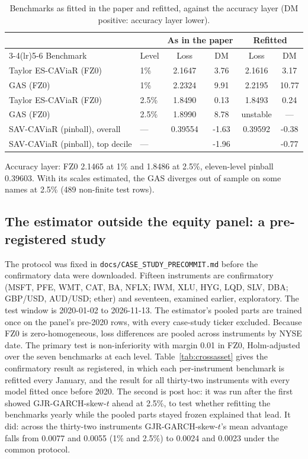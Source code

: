 \documentclass[11pt]{article}
\begin{document}
\begin{table}[htbp]\centering\begin{threeparttable}
\caption{Benchmarks as fitted in the paper and refitted, against the accuracy layer (DM positive: accuracy layer lower).}\label{tab:refit}\footnotesize
\begin{tabular}{llcccc}\toprule
 & & \multicolumn{2}{c}{As in the paper} & \multicolumn{2}{c}{Refitted} \\ \cmidrule(lr){3-4}\cmidrule(lr){5-6}
Benchmark & Level & Loss & DM & Loss & DM \\ \midrule
Taylor ES-CAViaR (FZ0) & 1\% & 2.1647 & 3.76 & 2.1616 & 3.17 \\
GAS (FZ0) & 1\% & 2.2324 & 9.91 & 2.2195 & 10.77 \\
Taylor ES-CAViaR (FZ0) & 2.5\% & 1.8490 & 0.13 & 1.8493 & 0.24 \\
GAS (FZ0) & 2.5\% & 1.8990 & 8.78 & unstable & --- \\
SAV-CAViaR (pinball), overall & --- & 0.39554 & -1.63 & 0.39592 & -0.38 \\
SAV-CAViaR (pinball), top decile & --- &  & -1.96 &  & -0.77 \\
\bottomrule\end{tabular}
\begin{tablenotes}\footnotesize\item Accuracy layer: FZ0 2.1465 at 1\% and 1.8486 at 2.5\%, eleven-level pinball 0.39603. With its scales estimated, the GAS diverges out of sample on some names at 2.5\% (489 non-finite test rows).\end{tablenotes}
\end{threeparttable}\end{table}

\subsection*{The estimator outside the equity panel: a pre-registered study}
The protocol was fixed in \texttt{docs/CASE\_STUDY\_PRECOMMIT.md} before the confirmatory data were downloaded. Fifteen instruments are confirmatory (MSFT, PFE, WMT, CAT, BA, NFLX; IWM, XLU, HYG, LQD, SLV, DBA; GBP/USD, AUD/USD; ether) and seventeen, examined earlier, exploratory. The test window is 2020-01-02 to 2026-11-13. The estimator's pooled parts are trained once on the panel's pre-2020 rows, with every case-study ticker excluded. Because FZ0 is zero-homogeneous, loss differences are pooled across instruments by NYSE date. The primary test is non-inferiority with margin 0.01 in FZ0, Holm-adjusted over the seven benchmarks at each level. Table~\ref{tab:crossasset} gives the confirmatory result as registered, in which each per-instrument benchmark is refitted every January, and the result for all thirty-two instruments with every model fitted once before 2020. The second is post hoc: it was run after the first showed GJR-GARCH-skew-$t$ ahead at 2.5\%, to test whether refitting the benchmarks yearly while the pooled parts stayed frozen explained that lead. It did: across the thirty-two instruments GJR-GARCH-skew-$t$'s mean advantage falls from 0.0077 and 0.0055 (1\% and 2.5\%) to 0.0024 and 0.0023 under the common protocol.
\end{document}
